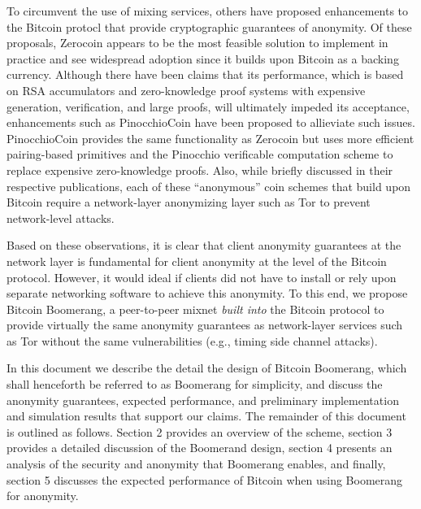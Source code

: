 To circumvent the use of mixing services, others have proposed enhancements to the Bitcoin protocl that provide cryptographic guarantees of anonymity. Of these proposals, Zerocoin \cite{zerocoin} appears to be the most feasible solution to implement in practice and see widespread adoption since it builds upon Bitcoin as a backing currency. Although there have been claims that its performance, which is based on RSA accumulators and zero-knowledge proof systems with expensive generation, verification, and large proofs, will ultimately impeded its acceptance, enhancements such as PinocchioCoin \cite{pinocchio} have been proposed to allieviate such issues. PinocchioCoin provides the same functionality as Zerocoin but uses more efficient pairing-based primitives and the Pinocchio verificable computation scheme to replace expensive zero-knowledge proofs. Also, while briefly discussed in their respective publications, each of these ``anonymous'' coin schemes that build upon Bitcoin require a network-layer anonymizing layer such as Tor to prevent network-level attacks.

Based on these observations, it is clear that client anonymity guarantees at the network layer is fundamental for client anonymity at the level of the Bitcoin protocol. However, it would ideal if clients did not have to install or rely upon separate networking software to achieve this anonymity. To this end, we propose Bitcoin Boomerang, a peer-to-peer mixnet \emph{built into} the Bitcoin protocol to provide virtually the same anonymity guarantees as network-layer services such as Tor without the same vulnerabilities (e.g., timing side channel attacks). 

In this document we describe the detail the design of Bitcoin Boomerang, which shall henceforth be referred to as Boomerang for simplicity, and discuss the anonymity guarantees, expected performance, and preliminary implementation and simulation results that support our claims. The remainder of this document is outlined as follows. Section 2 provides an overview of the scheme, section 3 provides a detailed discussion of the Boomerand design, section 4 presents an analysis of the security and anonymity that Boomerang enables, and finally, section 5 discusses the expected performance of Bitcoin when using Boomerang for anonymity. 



